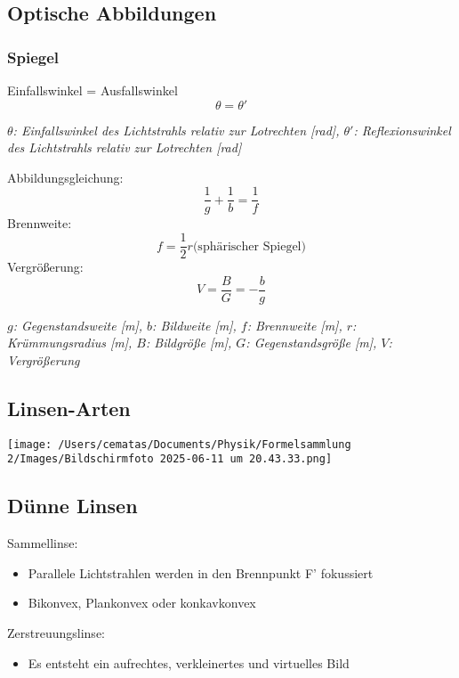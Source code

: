 \documentclass[a4paper,10pt]{article}
\newenvironment{displayformula}
{
	\begin{framed}
		\color{formulaColor}
	}
	{\end{framed}}
\newcommand{\formulalegend}[1]{%
	\par\vspace{0.5ex}%
	{{\color{legendColor}\RaggedRight\small\textit{#1}}}%
	\par\vspace{1.5ex}%
}
\begin{document}
\newpage

\subsection{Optische Abbildungen}

\subsubsection{Spiegel}
\begin{displayformula}
	Einfallswinkel = Ausfallswinkel
	\[
	\theta = \theta '
	\]
\end{displayformula}
\formulalegend{
	\( \theta \): Einfallswinkel des Lichtstrahls relativ zur Lotrechten [rad], 
	\( \theta' \): Reflexionswinkel des Lichtstrahls relativ zur Lotrechten [rad]
}

\begin{displayformula}
	Abbildungsgleichung:
	\[
	\frac{1}{g} + \frac{1}{b} = \frac{1}{f}
	\]
	Brennweite:
	\[
	f = \frac{1}{2} r \text{(sphärischer Spiegel)}
	\]
	Vergrößerung:
	\[
	V = \frac{B}{G} = -\frac{b}{g}
	\]
\end{displayformula}
\formulalegend{
	\( g \): Gegenstandsweite [m], \( b \): Bildweite [m], \( f \): Brennweite [m], \( r \): Krümmungsradius [m], \( B \): Bildgröße [m], \( G \): Gegenstandsgröße [m], \( V \): Vergrößerung
}

\subsection{Linsen-Arten}

\texttt{[image: /Users/cematas/Documents/Physik/Formelsammlung 2/Images/Bildschirmfoto 2025-06-11 um 20.43.33.png]}

\newpage

\subsection{Dünne Linsen}

Sammellinse:
\begin{itemize}
	\item Parallele Lichtstrahlen werden in den Brennpunkt F' fokussiert
	\item Bikonvex, Plankonvex oder konkavkonvex
\end{itemize}
Zerstreuungslinse:
\begin{itemize}
	\item Es entsteht ein aufrechtes, verkleinertes und virtuelles Bild
\end{itemize}
\end{document}
